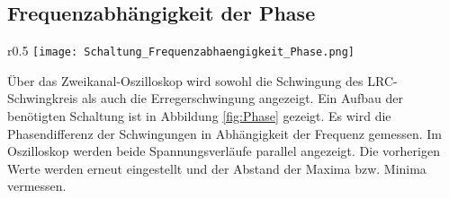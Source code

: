 \subsection{Frequenzabhängigkeit der Phase}
\begin{wrapfigure}{r}{0.5\textwidth}
  \centering
  \texttt{[image: Schaltung\_Frequenzabhaengigkeit\_Phase.png]}
  \caption{Versuchsaufbau \cite{anleitung}.}
  \label{fig:Phase}
\end{wrapfigure}
Über das Zweikanal-Oszilloskop wird sowohl die Schwingung des LRC-Schwingkreis als auch die Erregerschwingung angezeigt.
Ein Aufbau der benötigten Schaltung ist in Abbildung \ref{fig:Phase} gezeigt.
Es wird die Phasendifferenz der Schwingungen in Abhängigkeit der Frequenz gemessen. Im Oszilloskop werden beide Spannungsverläufe parallel
 angezeigt. Die vorherigen Werte werden erneut eingestellt und der Abstand der Maxima bzw. Minima vermessen.
